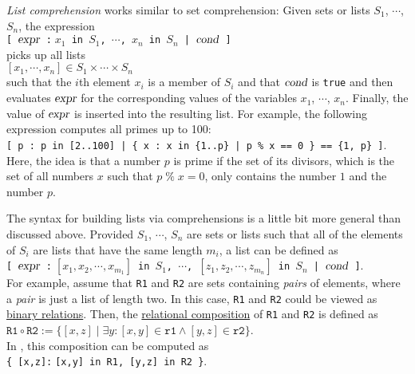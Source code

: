 \emph{List comprehension} works similar to set comprehension: Given sets or lists $S_1$, $\cdots$, $S_n$, the expression
\\[0.2cm]
\hspace*{1.3cm}
\texttt{[ $\textsl{expr}$ :$\;x_1$ in $S_1$, $\cdots$, $x_n$ in $S_n$ | $\textsl{cond}$ ]}
\\[0.2cm]
 picks up all lists 
\\[0.2cm]
\hspace*{1.3cm}
$[x_1, \cdots, x_n ] \in S_1 \times \cdots \times S_n$
\\[0.2cm]
such that the $i$th element $x_i$ is a member of $S_i$ and that
 $\textsl{cond}$ is \texttt{true} and then evaluates $\textsl{expr}$ for the corresponding values of the
variables $x_1$, $\cdots$, $x_n$.  Finally, the value of $\textsl{expr}$ is
inserted into the resulting list.  For example, the following expression  computes all primes up
to 100: 
\\[0.2cm]
\hspace*{1.3cm}
\texttt{[ p : p in [2..100] | \{ x : x in \{1..p\} | p \% x == 0 \} == \{1, p\} ]}.
\\[0.2cm]
Here, the idea is that a number $p$ is prime if the set of its divisors, which is the set
of all numbers $x$ such that $p \;\texttt{\%}\; x = 0$, only contains the number $1$ and
the number $p$. 

The syntax for building lists via comprehensions is a little bit more
general than discussed above.  Provided $S_1$, $\cdots$, $S_n$ are sets or lists
such that all of the elements of $S_i$ are lists that have the same length $m_i$, a list 
can be defined as
\\[0.2cm]
\hspace*{1.3cm}
\texttt{[ $\textsl{expr}$ :$\;[x_1,x_2,\cdots,x_{m_1}]$ in $S_1$, $\cdots$, $[z_1,z_2,\cdots, z_{m_n}]$ in $S_n$ | $\textsl{cond}$ ]}.
\\[0.2cm]
For example, assume that \texttt{R1} and \texttt{R2} are sets containing \emph{pairs} of elements, where a
\emph{pair} is just a list of length two.  In this case, \texttt{R1} and \texttt{R2} could be viewed as 
\href{https://en.wikipedia.org/wiki/Binary_relation}{binary relations}.  Then, the 
\href{https://en.wikipedia.org/wiki/Composition_of_relations}{relational composition} of \texttt{R1} and
\texttt{R2} is defined as
\\[0.2cm]
\hspace*{1.3cm}
$\mathtt{R1} \circ \mathtt{R2} := \{ [x,z] \mid \exists y: [x,y] \in \mathtt{r1} \wedge [y,z] \in\mathtt{r2} \}$. 
\\[0.2cm]
In \setlx, this composition can be computed as 
\\[0.2cm]
\hspace*{1.3cm}
\texttt{\{ [x,z]:$\;$[x,y] in R1, [y,z] in R2 \}}.

